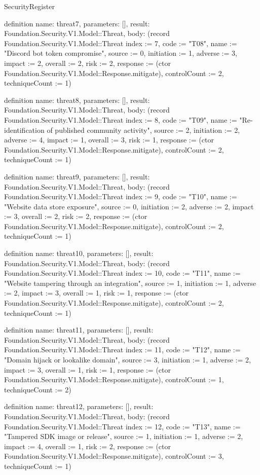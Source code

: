 \begin{lexlean}{SecurityRegister}
\begin{semanticmodule}
definition{
  name: threat7,
  parameters: [],
  result: Foundation.Security.V1.Model::Threat,
  body: (record Foundation.Security.V1.Model::Threat {index := 7, code := "T08", name := "Discord bot token compromise", source := 0, initiation := 1, adverse := 3, impact := 2, overall := 2, risk := 2, response := (ctor Foundation.Security.V1.Model::Response.mitigate), controlCount := 2, techniqueCount := 1})
}

definition{
  name: threat8,
  parameters: [],
  result: Foundation.Security.V1.Model::Threat,
  body: (record Foundation.Security.V1.Model::Threat {index := 8, code := "T09", name := "Re-identification of published community activity", source := 2, initiation := 2, adverse := 4, impact := 1, overall := 3, risk := 1, response := (ctor Foundation.Security.V1.Model::Response.mitigate), controlCount := 2, techniqueCount := 1})
}

definition{
  name: threat9,
  parameters: [],
  result: Foundation.Security.V1.Model::Threat,
  body: (record Foundation.Security.V1.Model::Threat {index := 9, code := "T10", name := "Website data store exposure", source := 0, initiation := 2, adverse := 2, impact := 3, overall := 2, risk := 2, response := (ctor Foundation.Security.V1.Model::Response.mitigate), controlCount := 2, techniqueCount := 1})
}

definition{
  name: threat10,
  parameters: [],
  result: Foundation.Security.V1.Model::Threat,
  body: (record Foundation.Security.V1.Model::Threat {index := 10, code := "T11", name := "Website tampering through an integration", source := 1, initiation := 1, adverse := 2, impact := 3, overall := 1, risk := 1, response := (ctor Foundation.Security.V1.Model::Response.mitigate), controlCount := 2, techniqueCount := 1})
}

definition{
  name: threat11,
  parameters: [],
  result: Foundation.Security.V1.Model::Threat,
  body: (record Foundation.Security.V1.Model::Threat {index := 11, code := "T12", name := "Domain hijack or lookalike domain", source := 3, initiation := 1, adverse := 2, impact := 3, overall := 1, risk := 1, response := (ctor Foundation.Security.V1.Model::Response.mitigate), controlCount := 1, techniqueCount := 2})
}

definition{
  name: threat12,
  parameters: [],
  result: Foundation.Security.V1.Model::Threat,
  body: (record Foundation.Security.V1.Model::Threat {index := 12, code := "T13", name := "Tampered SDK image or release", source := 1, initiation := 1, adverse := 2, impact := 4, overall := 1, risk := 2, response := (ctor Foundation.Security.V1.Model::Response.mitigate), controlCount := 3, techniqueCount := 1})
}


\end{semanticmodule}
\end{lexlean}
